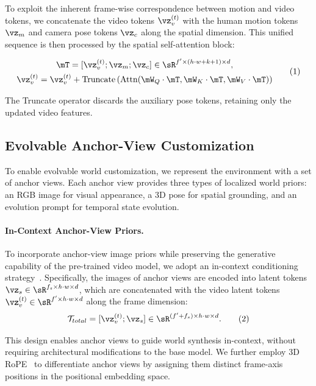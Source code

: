 To exploit the inherent frame-wise correspondence between motion and video tokens, we concatenate the video tokens $\vz_v^{(t)}$ with the human motion tokens $\vz_m$ and camera pose tokens $\vz_c$ along the spatial dimension. This unified sequence is then processed by the spatial self-attention block:

\[
\begin{gathered}
\mT = [\vz_v^{(t)}; \vz_m; \vz_c] \in \sR^{f' \times (h \cdot w + k + 1) \times d}, \\
\vz_v^{(t)} = \vz_v^{(t)} + \text{Truncate}\left(\text{Attn}(\mW_Q \cdot \mT, \mW_K \cdot \mT, \mW_V \cdot \mT)\right)
\end{gathered}
\tag{1}
\]

The Truncate operator discards the auxiliary pose tokens, retaining only the updated video features.



\subsection{Evolvable Anchor-View Customization}\label{sec:3.2}

To enable evolvable world customization, we represent the environment with a set of anchor views. 
Each anchor view provides three types of localized world priors: an RGB image for visual appearance, a 3D pose for spatial grounding, and an evolution prompt for temporal state evolution. 

\paragraph{In-Context Anchor-View Priors.}
To incorporate anchor-view image priors while preserving the generative capability of the pre-trained video model, we adopt an in-context conditioning strategy~\cite{huang2026cinescene, ju2025fulldit, ye2025unic}. 
Specifically, the images of anchor views are encoded into latent tokens $\vz_s \in \sR^{f_s \times h \cdot w \times d}$, which are concatenated with the video latent tokens $\vz_v^{(t)} \in \sR^{f' \times h \cdot w \times d}$ along the frame dimension:
\[
    \mathcal{T}_{total} = [\vz_v^{(t)}; \vz_s] \in \sR^{(f' + f_s) \times h \cdot w \times d}. \tag{2}
\]

This design enables anchor views to guide world synthesis in-context, without requiring architectural modifications to the base model. We further employ 3D RoPE~\cite{su2024roformer} to differentiate anchor views by assigning them distinct frame-axis positions in the positional embedding space.

